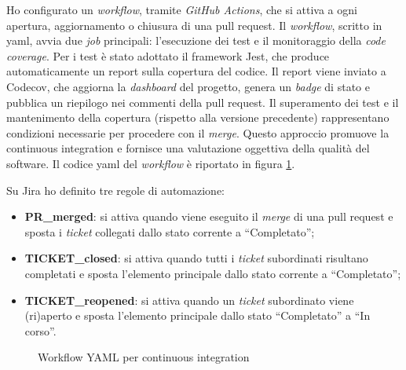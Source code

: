 Ho configurato un \textit{workflow}, tramite \textit{GitHub Actions}, che si attiva a ogni apertura, aggiornamento o chiusura di una \gls{pull request}. Il \textit{workflow}, scritto in \gls{yaml}, avvia due \textit{job} principali: l’esecuzione dei test e il monitoraggio della \textit{code coverage}. Per i test è stato adottato il \gls{framework} Jest, che produce automaticamente un report sulla copertura del codice. Il report viene inviato a Codecov, che aggiorna la \textit{dashboard} del progetto, genera un \textit{badge} di stato e pubblica un riepilogo nei commenti della \gls{pull request}. Il superamento dei test e il mantenimento della copertura (rispetto alla versione precedente) rappresentano condizioni necessarie per procedere con il \textit{merge}. Questo approccio promuove la \gls{continuous integration} e fornisce una valutazione oggettiva della qualità del software. Il codice \gls{yaml} del \textit{workflow} è riportato in figura \ref{fig:workflow_yaml}.

\vspace{10pt}
\noindent Su Jira ho definito tre regole di automazione:
\begin{itemize}
  \item \textbf{PR\_merged}: si attiva quando viene eseguito il \textit{merge} di una \gls{pull request} e sposta i \textit{ticket} collegati dallo stato corrente a “Completato”;
  \item \textbf{TICKET\_closed}: si attiva quando tutti i \textit{ticket} subordinati risultano completati e sposta l'elemento principale dallo stato corrente a “Completato”;
  \item \textbf{TICKET\_reopened}: si attiva quando un \textit{ticket} subordinato viene (ri)aperto e sposta l’elemento principale dallo stato “Completato” a “In corso”.
\end{itemize}

\begin{figure}[H] 
  \centering 
  \caption{Workflow YAML per continuous integration}
  \label{fig:workflow_yaml}
\end{figure}